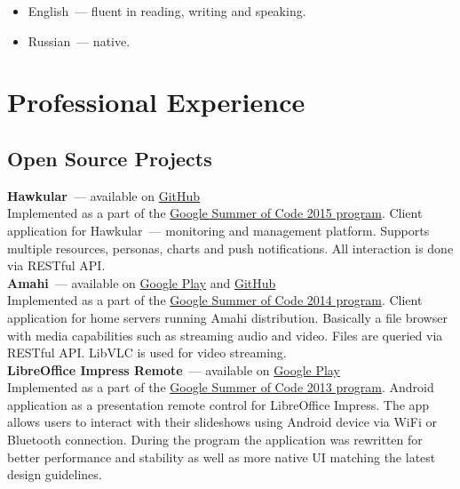     \begin{itemize}

      \item English~--- fluent in reading, writing and speaking.

      \item Russian~--- native.

    \end{itemize}


  \section*{Professional Experience}

    \subsection*{Open Source Projects}

      \textbf{Hawkular}~--- available on \href{https://github.com/hawkular/hawkular-android-client}{GitHub} \\

        Implemented as a part of the \href{https://developers.google.com/open-source/soc}{Google Summer of Code 2015 program}.
        Client application for Hawkular~--- monitoring and management platform.
        Supports multiple resources, personas, charts and push notifications.
        All interaction is done via RESTful API. \\

      \textbf{Amahi}~--- available on \href{https://play.google.com/store/apps/details?id=org.amahi.anywhere}{Google Play}
        and \href{https://github.com/amahi/android}{GitHub} \\

        Implemented as a part of the \href{https://developers.google.com/open-source/soc}{Google Summer of Code 2014 program}.
        Client application for home servers running Amahi distribution.
        Basically a file browser with media capabilities such as streaming audio and video.
        Files are queried via RESTful API. LibVLC is used for video streaming. \\

      \textbf{LibreOffice Impress Remote}~--- available on \href{https://play.google.com/store/apps/details?id=org.libreoffice.impressremote}{Google Play} \\

        Implemented as a part of the \href{https://developers.google.com/open-source/soc}{Google Summer of Code 2013 program}.
        Android application as a presentation remote control for LibreOffice Impress.
        The app allows users to interact with their slideshows using Android device
        via WiFi or Bluetooth connection. During the program the application was
        rewritten for better performance and stability as well as more native
        UI matching the latest design guidelines. \\

